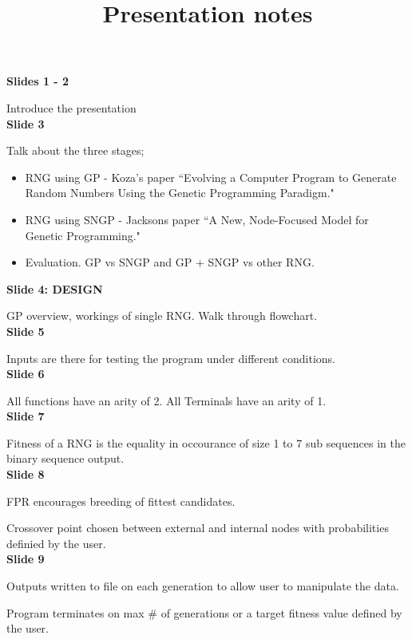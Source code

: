 \documentclass[a4paper,10.5pt]{article}
\title{Presentation notes}
\date{}
\begin{document}
\maketitle

\noindent \textbf{Slides 1 - 2}

Introduce the presentation\\

\noindent \textbf{Slide 3}

Talk about the three stages;

\begin{itemize}
\item RNG using GP - Koza's paper ``Evolving a Computer Program to Generate Random Numbers Using the Genetic Programming Paradigm."
\item RNG using SNGP - Jacksons paper ``A New, Node-Focused Model for Genetic Programming."
\item Evaluation. GP vs SNGP and GP + SNGP vs other RNG.
\end{itemize}

\noindent \textbf{Slide 4: DESIGN}

GP overview, workings of single RNG. Walk through flowchart.\\

\noindent \textbf{Slide 5}

Inputs are there for testing the program under different conditions.\\

\noindent \textbf{Slide 6}

All functions have an arity of 2.
All Terminals have an arity of 1.\\

\noindent \textbf{Slide 7}

Fitness of a RNG is the equality in occourance of size 1 to 7 sub sequences in the binary sequence output.\\

\noindent \textbf{Slide 8}

FPR encourages breeding of fittest candidates.

Crossover point chosen between external and internal nodes with probabilities definied by the user. \\

\noindent \textbf{Slide 9}

Outputs written to file on each generation to allow user to manipulate the data. 

Program terminates on max \# of generations or a target fitness value defined by the user.\\
\end{document}
